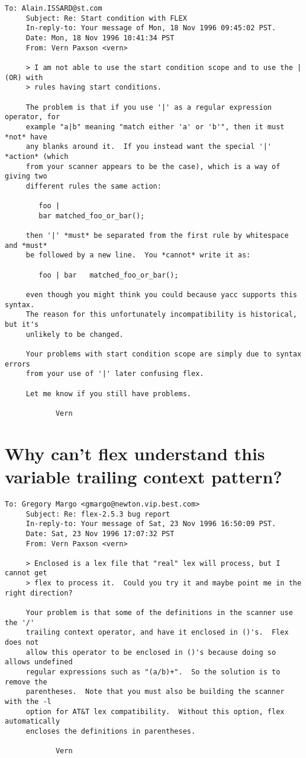 \documentclass[openany,oneside]{book}
\begin{document}
\begin{verbatim}
To: Alain.ISSARD@st.com
     Subject: Re: Start condition with FLEX
     In-reply-to: Your message of Mon, 18 Nov 1996 09:45:02 PST.
     Date: Mon, 18 Nov 1996 10:41:34 PST
     From: Vern Paxson <vern>
     
     > I am not able to use the start condition scope and to use the | (OR) with
     > rules having start conditions.
     
     The problem is that if you use '|' as a regular expression operator, for
     example "a|b" meaning "match either 'a' or 'b'", then it must *not* have
     any blanks around it.  If you instead want the special '|' *action* (which
     from your scanner appears to be the case), which is a way of giving two
     different rules the same action:
     
     	foo	|
     	bar	matched_foo_or_bar();
     
     then '|' *must* be separated from the first rule by whitespace and *must*
     be followed by a new line.  You *cannot* write it as:
     
     	foo | bar	matched_foo_or_bar();
     
     even though you might think you could because yacc supports this syntax.
     The reason for this unfortunately incompatibility is historical, but it's
     unlikely to be changed.
     
     Your problems with start condition scope are simply due to syntax errors
     from your use of '|' later confusing flex.
     
     Let me know if you still have problems.
     
     		Vern
\end{verbatim}

\section{Why can't flex understand this variable trailing context pattern?}

\begin{verbatim}
To: Gregory Margo <gmargo@newton.vip.best.com>
     Subject: Re: flex-2.5.3 bug report
     In-reply-to: Your message of Sat, 23 Nov 1996 16:50:09 PST.
     Date: Sat, 23 Nov 1996 17:07:32 PST
     From: Vern Paxson <vern>
     
     > Enclosed is a lex file that "real" lex will process, but I cannot get
     > flex to process it.  Could you try it and maybe point me in the right direction?
     
     Your problem is that some of the definitions in the scanner use the '/'
     trailing context operator, and have it enclosed in ()'s.  Flex does not
     allow this operator to be enclosed in ()'s because doing so allows undefined
     regular expressions such as "(a/b)+".  So the solution is to remove the
     parentheses.  Note that you must also be building the scanner with the -l
     option for AT&T lex compatibility.  Without this option, flex automatically
     encloses the definitions in parentheses.
     
     		Vern
\end{verbatim}
\end{document}
